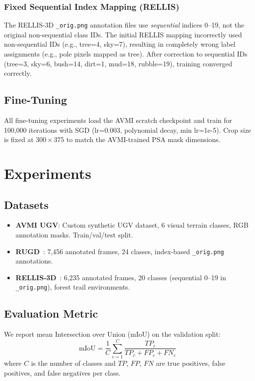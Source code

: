 \documentclass[conference]{IEEEtran}
\begin{document}
\subsubsection{Fixed Sequential Index Mapping (RELLIS)}
The RELLIS-3D \texttt{\_orig.png} annotation files use \emph{sequential} indices 0--19, not the original non-sequential class IDs. The initial RELLIS mapping incorrectly used non-sequential IDs (e.g., tree=4, sky=7), resulting in completely wrong label assignments (e.g., pole pixels mapped as tree). After correction to sequential IDs (tree=3, sky=6, bush=14, dirt=1, mud=18, rubble=19), training converged correctly.

\subsection{Fine-Tuning}
All fine-tuning experiments load the AVMI scratch checkpoint and train for 100,000 iterations with SGD (lr=0.003, polynomial decay, min lr=1e-5). Crop size is fixed at $300\times375$ to match the AVMI-trained PSA mask dimensions.

\section{Experiments}

\subsection{Datasets}
\begin{itemize}
    \item \textbf{AVMI UGV}: Custom synthetic UGV dataset, 6 visual terrain classes, RGB annotation masks. Train/val/test split.
    \item \textbf{RUGD}~\cite{rugd2019}: 7,456 annotated frames, 24 classes, index-based \texttt{\_orig.png} annotations.
    \item \textbf{RELLIS-3D}~\cite{rellis2021}: 6,235 annotated frames, 20 classes (sequential 0--19 in \texttt{\_orig.png}), forest trail environments.
\end{itemize}

\subsection{Evaluation Metric}
We report mean Intersection over Union (mIoU) on the validation split:
\begin{equation}
    \text{mIoU} = \frac{1}{C} \sum_{c=1}^{C} \frac{TP_c}{TP_c + FP_c + FN_c}
\end{equation}
where $C$ is the number of classes and $TP$, $FP$, $FN$ are true positives, false positives, and false negatives per class.
\end{document}
